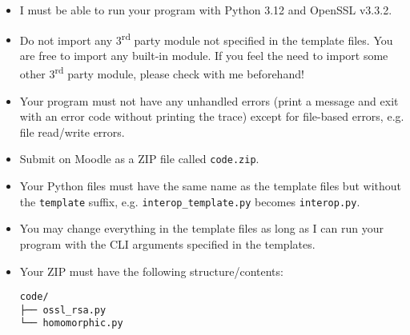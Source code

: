 \documentclass{homework}
\begin{document}
\begin{itemize}
  \item I must be able to run your program with Python 3.12 and OpenSSL v3.3.2\footnotemark{}.
  \item Do not import any 3\textsuperscript{rd} party module\footnotemark{} not specified in the template files.
  You are free to import any built-in module.
  If you feel the need to import some other 3\textsuperscript{rd} party module, please check with me beforehand!
  \item Your program must not have any unhandled errors (print a message and exit with an error code without printing the trace) except for file-based errors, e.g. file read/write errors.
  \item Submit on Moodle as a ZIP file called \texttt{code.zip}.
  \item Your Python files must have the same name as the template files but without the \texttt{template} suffix, e.g. \texttt{interop\_template.py} becomes \texttt{interop.py}.
  \item You may change everything in the template files as long as I can run your program with the CLI arguments specified in the templates.
  \iffalse
  \item \textbf{Check before you submit!}
  You have ways to check whether each of your 3 tasks is functionally correct.
  If
  \begin{enumerate}
    \item I cannot review your homework before the deadline, \emph{and}
    \item your homework does not pass the checks, \emph{and}
    \item you have not stated in your report that this is the case (and what did you try),
  \end{enumerate}
  you \emph{fail} the homework!
  \fi
  \item Your ZIP must have the following structure/contents:
  \begin{Verbatim}
code/
├── ossl_rsa.py
└── homomorphic.py
  \end{Verbatim}
\begin{Verbatim}
  
\end{Verbatim}
\end{itemize}
\end{document}
